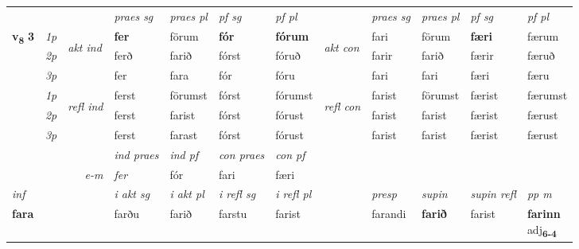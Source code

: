 \begin{longtable}[l]{X>{\footnotesize\itshape}llXXXXlXXXX}
 & &   & \textit{praes sg}  & \textit{praes pl}    & \textit{ pf sg} & \textit{pf pl} & & \textit{praes sg}  & \textit{praes pl}    & \textit{pf sg} & \textit{pf pl }  \\ \cmidrule{4-7} \cmidrule{9-12}
 \multirow{2}{*}{{{\textbf{v{\textsubscript{8}}} \Large{\textbf{3}}}}}  & 1p & \multirow{3}{*}{\begin{turn}{90}\textit{akt ind}\end{turn}} & \textbf{fer} & förum & \textbf{fór} & \textbf{fórum} & \multirow{3}{*}{\begin{turn}{90}\textit{akt con}\end{turn}} &fari & förum & \textbf{færi} & færum\\*
 & 2p &  &  ferð  & farið & fórst & fóruð & & farir & farið & færir & færuð \\*
 & 3p &  & fer & fara & fór & fóru & & fari & fari& færi & færu \\*
\cmidrule{4-7} \cmidrule{9-12}
 & 1p & \multirow{3}{*}{\begin{turn}{90}\textit{refl ind}\end{turn}}  & ferst & förumst & fórst & fórumst & \multirow{3}{*}{\begin{turn}{90}\textit{refl con}\end{turn}}  &farist & förumst & færist & færumst \\*
 & 2p &  & ferst & farist & fórst & fórust & &farist & farist & færist & færust \\*
 & 3p  & & ferst & farast & fórst & fórust & & farist & farist& færist & færust \\*
\cmidrule{4-7} \cmidrule{9-12}

   && &  \textit{ind praes} & \textit{ind pf} & \textit{con praes} & \textit{con pf} \\*
\multicolumn{3}{r}{\textit{e-m}} & fer & fór & fari & færi \\*

\cmidrule{4-7}
   {\textit{inf}} & &  & \textit{i akt sg} & \textit{i akt pl} & \textit{i refl sg} & \textit{i refl pl} && \textit{presp} & \textit{supin} & \textit{supin refl} & \textit{pp m} \\*
  {\textbf{fara}} & && farðu  & farið & farstu & farist && farandi &  \textbf{farið} & farist & \specialcell{\textbf{farinn} \\ adj\textbf{\textsubscript{6-4}}} \\*


\end{longtable}
